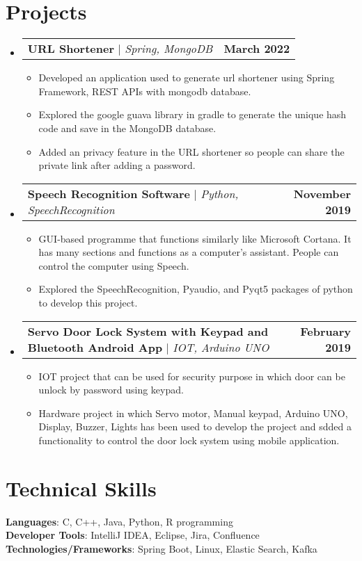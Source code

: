 \documentclass[letterpaper,11pt]{article}
\makeatletter
\newcommand{\resumeItem}[1]{
  \item\small{
    {#1 \vspace{-2pt}}
  }
}
\newcommand{\resumeProjectHeading}[2]{
    \item
    \begin{tabular*}{1.001\textwidth}{l@{\extracolsep{\fill}}r}
      \small#1 & \textbf{\small #2}\\
    \end{tabular*}\vspace{-7pt}
}
\newcommand{\resumeSubHeadingListStart}{\begin{itemize}[leftmargin=0.0in, label={}]}
\newcommand{\resumeSubHeadingListEnd}{\end{itemize}}
\newcommand{\resumeItemListStart}{\begin{itemize}}
\newcommand{\resumeItemListEnd}{\end{itemize}\vspace{-5pt}}
\makeatother
\begin{document}
\section{Projects}
    \vspace{-5pt}
    \resumeSubHeadingListStart
      \resumeProjectHeading
          {\textbf{URL Shortener} $|$ \emph{Spring, MongoDB}}{March 2022}
          \resumeItemListStart
            \resumeItem{Developed an application used to generate url shortener using Spring Framework, REST APIs with mongodb database.}
            \resumeItem{Explored the google guava library in gradle to generate the unique hash code and save in the MongoDB database.}
            \resumeItem{Added an privacy feature in the URL shortener so people can share the private link after adding a password.}
          \resumeItemListEnd
          \vspace{-13pt}
      \resumeProjectHeading
          {\textbf{Speech Recognition Software} $|$ \emph{Python, SpeechRecognition }}{November 2019}
          \resumeItemListStart
            \resumeItem{GUI-based programme that functions similarly like Microsoft Cortana. It has many sections and functions as a computer's assistant. People can control the computer using Speech.}
            \resumeItem{Explored the SpeechRecognition, Pyaudio, and Pyqt5 packages of python to develop this project.}
          \resumeItemListEnd 
          \vspace{-13pt}
          \resumeProjectHeading
          {\textbf{Servo Door Lock System with Keypad and Bluetooth Android App} $|$ \emph{IOT, Arduino UNO}}{February 2019}
          \resumeItemListStart
            \resumeItem{IOT project that can be used for security purpose in which door can be unlock by password using keypad.}
            \resumeItem{Hardware project in which Servo motor, Manual keypad, Arduino UNO, Display, Buzzer, Lights has been used to develop the project and sdded a functionality to control the door lock system using mobile application.}
          \resumeItemListEnd 
    \resumeSubHeadingListEnd
\vspace{-15pt}


%
\section{Technical Skills}
 \begin{itemize}[leftmargin=0.15in, label={}]
    \small{\item{
     \textbf{Languages}{: C, C++, Java, Python, R programming} \\
     \textbf{Developer Tools}{: IntelliJ IDEA, Eclipse, Jira, Confluence} \\
     \textbf{Technologies/Frameworks}{: Spring Boot, Linux, Elastic Search, Kafka} \\
    }}
 \end{itemize}
 \vspace{-16pt}
\end{document}
